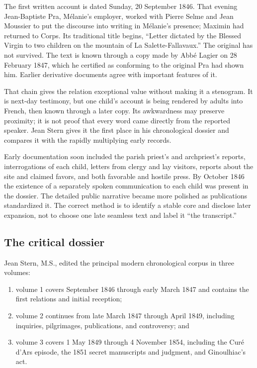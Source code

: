 The first written account is dated Sunday, 20 September 1846. That evening Jean-Baptiste Pra, Mélanie's employer, worked with Pierre Selme and Jean Moussier to put the discourse into writing in Mélanie's presence; Maximin had returned to Corps. Its traditional title begins, ``Letter dictated by the Blessed Virgin to two children on the mountain of La Salette-Fallavaux.'' The original has not survived. The text is known through a copy made by Abbé Lagier on 28 February 1847, which he certified as conforming to the original Pra had shown him. Earlier derivative documents agree with important features of it.

That chain gives the relation exceptional value without making it a stenogram. It is next-day testimony, but one child's account is being rendered by adults into French, then known through a later copy. Its awkwardness may preserve proximity; it is not proof that every word came directly from the reported speaker. Jean Stern gives it the first place in his chronological dossier and compares it with the rapidly multiplying early records.

Early documentation soon included the parish priest's and archpriest's reports, interrogations of each child, letters from clergy and lay visitors, reports about the site and claimed favors, and both favorable and hostile press. By October 1846 the existence of a separately spoken communication to each child was present in the dossier. The detailed public narrative became more polished as publications standardized it. The correct method is to identify a stable core and disclose later expansion, not to choose one late seamless text and label it ``the transcript.''

\subsection{The critical dossier}

Jean Stern, M.S., edited the principal modern chronological corpus in three volumes:

\begin{enumerate}
  \item volume 1 covers September 1846 through early March 1847 and contains the first relations and initial reception;
  \item volume 2 continues from late March 1847 through April 1849, including inquiries, pilgrimages, publications, and controversy; and
  \item volume 3 covers 1 May 1849 through 4 November 1854, including the Curé d'Ars episode, the 1851 secret manuscripts and judgment, and Ginoulhiac's act.
\end{enumerate}

